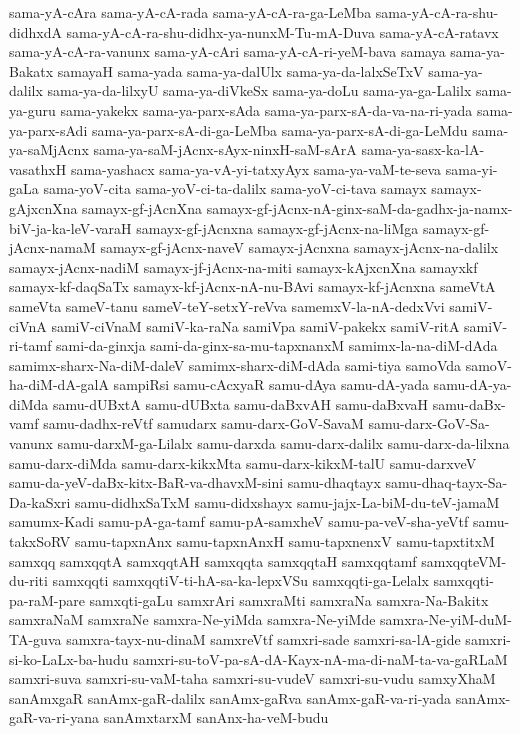 {sama-yA-cAra
sama-yA-cA-rada
sama-yA-cA-ra-ga-LeMba
sama-yA-cA-ra-shu-didhxdA
sama-yA-cA-ra-shu-didhx-ya-nunxM-Tu-mA-Duva
sama-yA-cA-ratavx
sama-yA-cA-ra-vanunx
sama-yA-cAri
sama-yA-cA-ri-yeM-bava
samaya
sama-ya-Bakatx
samayaH
sama-yada
sama-ya-dalUlx
sama-ya-da-lalxSeTxV
sama-ya-dalilx
sama-ya-da-lilxyU
sama-ya-diVkeSx
sama-ya-doLu
sama-ya-ga-Lalilx
sama-ya-guru
sama-yakekx
sama-ya-parx-sAda
sama-ya-parx-sA-da-va-na-ri-yada
sama-ya-parx-sAdi
sama-ya-parx-sA-di-ga-LeMba
sama-ya-parx-sA-di-ga-LeMdu
sama-ya-saMjAcnx
sama-ya-saM-jAcnx-sAyx-ninxH-saM-sArA
sama-ya-sasx-ka-lA-vasathxH
sama-yashacx
sama-ya-vA-yi-tatxyAyx
sama-ya-vaM-te-seva
sama-yi-gaLa
sama-yoV-cita
sama-yoV-ci-ta-dalilx
sama-yoV-ci-tava
samayx
samayx-gAjxcnXna
samayx-gf-jAcnXna
samayx-gf-jAcnx-nA-ginx-saM-da-gadhx-ja-namx-biV-ja-ka-leV-varaH
samayx-gf-jAcnxna
samayx-gf-jAcnx-na-liMga
samayx-gf-jAcnx-namaM
samayx-gf-jAcnx-naveV
samayx-jAcnxna
samayx-jAcnx-na-dalilx
samayx-jAcnx-nadiM
samayx-jf-jAcnx-na-miti
samayx-kAjxcnXna
samayxkf
samayx-kf-daqSaTx
samayx-kf-jAcnx-nA-nu-BAvi
samayx-kf-jAcnxna
sameVtA
sameVta
sameV-tanu
sameV-teY-setxY-reVva
samemxV-la-nA-dedxVvi
samiV-ciVnA
samiV-ciVnaM
samiV-ka-raNa
samiVpa
samiV-pakekx
samiV-ritA
samiV-ri-tamf
sami-da-ginxja
sami-da-ginx-sa-mu-tapxnanxM
samimx-la-na-diM-dAda
samimx-sharx-Na-diM-daleV
samimx-sharx-diM-dAda
sami-tiya
samoVda
samoV-ha-diM-dA-galA
sampiRsi
samu-cAcxyaR
samu-dAya
samu-dA-yada
samu-dA-ya-diMda
samu-dUBxtA
samu-dUBxta
samu-daBxvAH
samu-daBxvaH
samu-daBx-vamf
samu-dadhx-reVtf
samudarx
samu-darx-GoV-SavaM
samu-darx-GoV-Sa-vanunx
samu-darxM-ga-Lilalx
samu-darxda
samu-darx-dalilx
samu-darx-da-lilxna
samu-darx-diMda
samu-darx-kikxMta
samu-darx-kikxM-talU
samu-darxveV
samu-da-yeV-daBx-kitx-BaR-va-dhavxM-sini
samu-dhaqtayx
samu-dhaq-tayx-Sa-Da-kaSxri
samu-didhxSaTxM
samu-didxshayx
samu-jajx-La-biM-du-teV-jamaM
samumx-Kadi
samu-pA-ga-tamf
samu-pA-samxheV
samu-pa-veV-sha-yeVtf
samu-takxSoRV
samu-tapxnAnx
samu-tapxnAnxH
samu-tapxnenxV
samu-tapxtitxM
samxqq
samxqqtA
samxqqtAH
samxqqta
samxqqtaH
samxqqtamf
samxqqteVM-du-riti
samxqqti
samxqqtiV-ti-hA-sa-ka-lepxVSu
samxqqti-ga-Lelalx
samxqqti-pa-raM-pare
samxqti-gaLu
samxrAri
samxraMti
samxraNa
samxra-Na-Bakitx
samxraNaM
samxraNe
samxra-Ne-yiMda
samxra-Ne-yiMde
samxra-Ne-yiM-duM-TA-guva
samxra-tayx-nu-dinaM
samxreVtf
samxri-sade
samxri-sa-lA-gide
samxri-si-ko-LaLx-ba-hudu
samxri-su-toV-pa-sA-dA-Kayx-nA-ma-di-naM-ta-va-gaRLaM
samxri-suva
samxri-su-vaM-taha
samxri-su-vudeV
samxri-su-vudu
samxyXhaM
sanAmxgaR
sanAmx-gaR-dalilx
sanAmx-gaRva
sanAmx-gaR-va-ri-yada
sanAmx-gaR-va-ri-yana
sanAmxtarxM
sanAnx-ha-veM-budu
}
